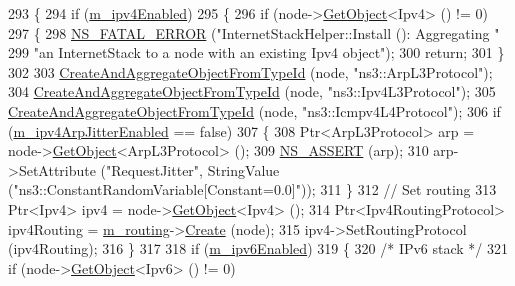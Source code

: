 \begin{DoxyCode}
293 \{
294   \textcolor{keywordflow}{if} (\hyperlink{classns3_1_1InternetStackHelper_a52b041bc6e084a821e6885c71d38df31}{m\_ipv4Enabled})
295     \{
296       \textcolor{keywordflow}{if} (node->\hyperlink{classns3_1_1Object_a13e18c00017096c8381eb651d5bd0783}{GetObject}<Ipv4> () != 0)
297         \{
298           \hyperlink{group__fatal_ga5131d5e3f75d7d4cbfd706ac456fdc85}{NS\_FATAL\_ERROR} (\textcolor{stringliteral}{"InternetStackHelper::Install (): Aggregating "} 
299                           \textcolor{stringliteral}{"an InternetStack to a node with an existing Ipv4 object"});
300           \textcolor{keywordflow}{return};
301         \}
302 
303       \hyperlink{classns3_1_1InternetStackHelper_a6605ba9c1bbfdf9ebe09c5dbcfce2451}{CreateAndAggregateObjectFromTypeId} (node, \textcolor{stringliteral}{"ns3::ArpL3Protocol"});
304       \hyperlink{classns3_1_1InternetStackHelper_a6605ba9c1bbfdf9ebe09c5dbcfce2451}{CreateAndAggregateObjectFromTypeId} (node, \textcolor{stringliteral}{"ns3::Ipv4L3Protocol"});
305       \hyperlink{classns3_1_1InternetStackHelper_a6605ba9c1bbfdf9ebe09c5dbcfce2451}{CreateAndAggregateObjectFromTypeId} (node, \textcolor{stringliteral}{"ns3::Icmpv4L4Protocol"});
306       \textcolor{keywordflow}{if} (\hyperlink{classns3_1_1InternetStackHelper_a9b4460c9d7b52d6ce2d390ffd1074bfa}{m\_ipv4ArpJitterEnabled} == \textcolor{keyword}{false})
307         \{
308           Ptr<ArpL3Protocol> arp = node->\hyperlink{classns3_1_1Object_a13e18c00017096c8381eb651d5bd0783}{GetObject}<ArpL3Protocol> ();
309           \hyperlink{assert_8h_a6dccdb0de9b252f60088ce281c49d052}{NS\_ASSERT} (arp);
310           arp->SetAttribute (\textcolor{stringliteral}{"RequestJitter"}, StringValue (\textcolor{stringliteral}{"ns3::ConstantRandomVariable[Constant=0.0]"}));
311         \}
312       \textcolor{comment}{// Set routing}
313       Ptr<Ipv4> ipv4 = node->\hyperlink{classns3_1_1Object_a13e18c00017096c8381eb651d5bd0783}{GetObject}<Ipv4> ();
314       Ptr<Ipv4RoutingProtocol> ipv4Routing = \hyperlink{classns3_1_1InternetStackHelper_a575127688a08b5a2f3f8e07839ea9807}{m\_routing}->\hyperlink{classns3_1_1Ipv4RoutingHelper_aa00350f9ab9f2ea2ff83f6ef04dae209}{Create} (node);
315       ipv4->SetRoutingProtocol (ipv4Routing);
316     \}
317 
318   \textcolor{keywordflow}{if} (\hyperlink{classns3_1_1InternetStackHelper_a2eade9878232a41166cd0638cab7c3bf}{m\_ipv6Enabled})
319     \{
320       \textcolor{comment}{/* IPv6 stack */}
321       \textcolor{keywordflow}{if} (node->\hyperlink{classns3_1_1Object_a13e18c00017096c8381eb651d5bd0783}{GetObject}<Ipv6> () != 0)

\end{DoxyCode}
